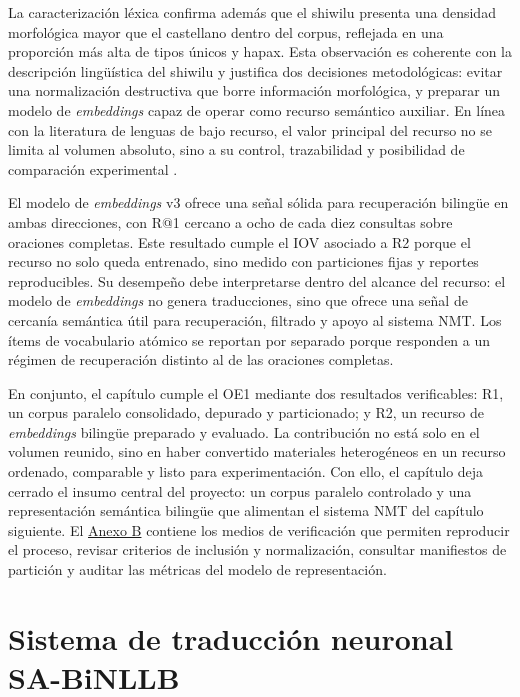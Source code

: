 \documentclass[12pt,a4paper,oneside]{book}
\begin{document}
La caracterización léxica confirma además que el shiwilu presenta una densidad morfológica mayor que el castellano dentro del corpus, reflejada en una proporción más alta de tipos únicos y hapax. Esta observación es coherente con la descripción lingüística del shiwilu \parencite{valenzuela2018} y justifica dos decisiones metodológicas: evitar una normalización destructiva que borre información morfológica, y preparar un modelo de \emph{embeddings} capaz de operar como recurso semántico auxiliar. En línea con la literatura de lenguas de bajo recurso, el valor principal del recurso no se limita al volumen absoluto, sino a su control, trazabilidad y posibilidad de comparación experimental \parencite{koehn2017,artetxe2019}.

El modelo de \emph{embeddings} v3 ofrece una señal sólida para recuperación bilingüe en ambas direcciones, con R@1 cercano a ocho de cada diez consultas sobre oraciones completas. Este resultado cumple el IOV asociado a R2 porque el recurso no solo queda entrenado, sino medido con particiones fijas y reportes reproducibles. Su desempeño debe interpretarse dentro del alcance del recurso: el modelo de \emph{embeddings} no genera traducciones, sino que ofrece una señal de cercanía semántica útil para recuperación, filtrado y apoyo al sistema NMT. Los ítems de vocabulario atómico se reportan por separado porque responden a un régimen de recuperación distinto al de las oraciones completas.

En conjunto, el capítulo cumple el OE1 mediante dos resultados verificables: R1, un corpus paralelo consolidado, depurado y particionado; y R2, un recurso de \emph{embeddings} bilingüe preparado y evaluado. La contribución no está solo en el volumen reunido, sino en haber convertido materiales heterogéneos en un recurso ordenado, comparable y listo para experimentación. Con ello, el capítulo deja cerrado el insumo central del proyecto: un corpus paralelo controlado y una representación semántica bilingüe que alimentan el sistema NMT del capítulo siguiente. El \hyperref[anexo-documento-reproducible]{Anexo B} contiene los medios de verificación que permiten reproducir el proceso, revisar criterios de inclusión y normalización, consultar manifiestos de partición y auditar las métricas del modelo de representación.

\chapter{Sistema de traducción neuronal SA-BiNLLB}\label{nmt-sa-binllb}
\end{document}
